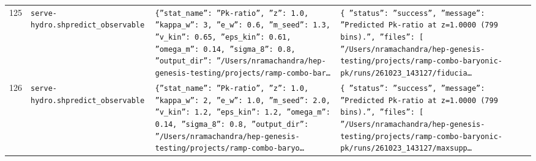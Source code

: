 \documentclass[11pt,a4paper]{article}
\begin{document}
\begin{longtable}{@{}p{}p{}p{}p{}@{}}
125 & \texttt{serve-hydro.sh}\newline\texttt{predict\_\allowbreak{}observable} & \texttt{\{''stat\_\allowbreak{}name'':\allowbreak{} ''Pk-ratio'',\allowbreak{} ''z'':\allowbreak{} 1.0,\allowbreak{} ''kappa\_\allowbreak{}w'':\allowbreak{} 3,\allowbreak{} ''e\_\allowbreak{}w'':\allowbreak{} 0.6,\allowbreak{} ''m\_\allowbreak{}seed'':\allowbreak{} 1.3,\allowbreak{} ''v\_\allowbreak{}kin'':\allowbreak{} 0.65,\allowbreak{} ''eps\_\allowbreak{}kin'':\allowbreak{} 0.61,\allowbreak{} ''omega\_\allowbreak{}m'':\allowbreak{} 0.14,\allowbreak{} ''sigma\_\allowbreak{}8'':\allowbreak{} 0.8,\allowbreak{} ''output\_\allowbreak{}dir'':\allowbreak{} ''/\allowbreak{}Users/\allowbreak{}nramachandra/\allowbreak{}hep-genesis-testing/\allowbreak{}projects/\allowbreak{}ramp-combo-bar\ldots{}\allowbreak{}} & \texttt{\{   ''status'':\allowbreak{} ''success'',\allowbreak{}   ''message'':\allowbreak{} ''Predicted Pk-ratio at z=\allowbreak{}1.0000 (799 bins)\allowbreak{}.'',\allowbreak{}   ''files'':\allowbreak{} [     ''/\allowbreak{}Users/\allowbreak{}nramachandra/\allowbreak{}hep-genesis-testing/\allowbreak{}projects/\allowbreak{}ramp-combo-baryonic-pk/\allowbreak{}runs/\allowbreak{}261023\_\allowbreak{}143127/\allowbreak{}fiducia\ldots{}\allowbreak{}} \\
126 & \texttt{serve-hydro.sh}\newline\texttt{predict\_\allowbreak{}observable} & \texttt{\{''stat\_\allowbreak{}name'':\allowbreak{} ''Pk-ratio'',\allowbreak{} ''z'':\allowbreak{} 1.0,\allowbreak{} ''kappa\_\allowbreak{}w'':\allowbreak{} 2,\allowbreak{} ''e\_\allowbreak{}w'':\allowbreak{} 1.0,\allowbreak{} ''m\_\allowbreak{}seed'':\allowbreak{} 2.0,\allowbreak{} ''v\_\allowbreak{}kin'':\allowbreak{} 1.2,\allowbreak{} ''eps\_\allowbreak{}kin'':\allowbreak{} 1.2,\allowbreak{} ''omega\_\allowbreak{}m'':\allowbreak{} 0.14,\allowbreak{} ''sigma\_\allowbreak{}8'':\allowbreak{} 0.8,\allowbreak{} ''output\_\allowbreak{}dir'':\allowbreak{} ''/\allowbreak{}Users/\allowbreak{}nramachandra/\allowbreak{}hep-genesis-testing/\allowbreak{}projects/\allowbreak{}ramp-combo-baryo\ldots{}\allowbreak{}} & \texttt{\{   ''status'':\allowbreak{} ''success'',\allowbreak{}   ''message'':\allowbreak{} ''Predicted Pk-ratio at z=\allowbreak{}1.0000 (799 bins)\allowbreak{}.'',\allowbreak{}   ''files'':\allowbreak{} [     ''/\allowbreak{}Users/\allowbreak{}nramachandra/\allowbreak{}hep-genesis-testing/\allowbreak{}projects/\allowbreak{}ramp-combo-baryonic-pk/\allowbreak{}runs/\allowbreak{}261023\_\allowbreak{}143127/\allowbreak{}maxsupp\ldots{}\allowbreak{}} \\

\end{longtable}
\end{document}
